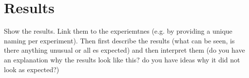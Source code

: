 \chapter{Results} \label{sec:results}

Show the results. Link them to the experiemtnes (e.g. by providing a unique naming per experiment). Then first describe the results (what can be seen, is there anything unusual or all es expected) and then interpret them (do you have an explanation why the results look like this? do you have ideas why it did not look as expected?)


\newpage
